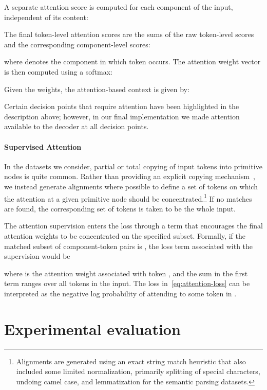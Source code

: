 \documentclass[11pt,a4paper]{article}
\begin{document}
A separate attention score  is computed for each component of the input, independent of its content:


The final token-level attention scores are the sums of the raw token-level scores and the corresponding component-level scores:

where  denotes the component in which token  occurs. The attention weight vector  is then computed using a softmax:

Given the weights, the attention-based context is given by:


Certain decision points that require attention have been highlighted in the description above; however, in our final implementation we made attention available to the decoder at all decision points.

\paragraph{Supervised Attention}

In the datasets we consider, partial or total copying of input tokens into primitive nodes is quite common. Rather than providing an explicit copying mechanism~\citep{Ling16Code}, we instead generate alignments where possible to
define a set of tokens on which the attention at a given primitive node should be concentrated.\footnote{Alignments are generated using an exact string match heuristic that also included some limited normalization, primarily splitting of special characters, undoing camel case, and lemmatization for the semantic parsing datasets.} If no matches are found, the corresponding set of tokens is taken to be the whole input.

The attention supervision enters the loss through a term that encourages the final attention weights to be concentrated on the specified subset. Formally, if the matched subset of component-token pairs is , the loss term associated with the supervision would be

where  is the attention weight associated with token , and the sum in the first term ranges over all tokens in the input. The loss in~\eqref{eq:attention-loss} can be interpreted as the negative log probability of attending to some token in .

\section{Experimental evaluation}
\end{document}
